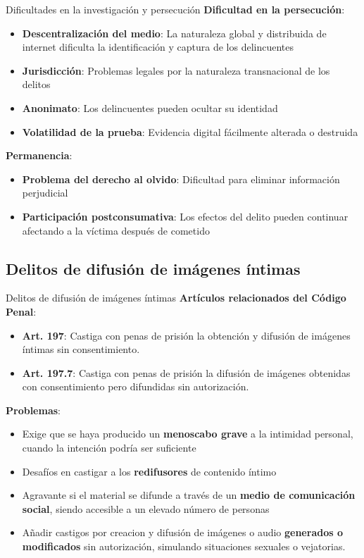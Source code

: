 \documentclass{beamer}
\begin{document}
    \begin{frame}{Dificultades en la investigación y persecución}
        \textbf{Dificultad en la persecución}:
        \begin{itemize}
            \small
            \item \textbf{Descentralización del medio}: La naturaleza global y distribuida de internet dificulta la identificación y captura de los delincuentes
            \item \textbf{Jurisdicción}: Problemas legales por la naturaleza transnacional de los delitos
            \item \textbf{Anonimato}: Los delincuentes pueden ocultar su identidad
            \item \textbf{Volatilidad de la prueba}: Evidencia digital fácilmente alterada o destruida
        \end{itemize}
        \textbf{Permanencia}:
        \begin{itemize}
            \small
            \item \textbf{Problema del derecho al olvido}: Dificultad para eliminar información perjudicial
            \item \textbf{Participación postconsumativa}: Los efectos del delito pueden continuar afectando a la víctima después de cometido
        \end{itemize}
    \end{frame}

    \subsection{Delitos de difusión de imágenes íntimas}
    \begin{frame}{Delitos de difusión de imágenes íntimas}
        \textbf{Artículos relacionados del Código Penal}:
        \begin{itemize}
            \small
            \item \textbf{Art. 197}: Castiga con penas de prisión la obtención y difusión de imágenes íntimas sin consentimiento.
            \item \textbf{Art. 197.7}: Castiga con penas de prisión la difusión de imágenes obtenidas con consentimiento pero difundidas sin autorización.
        \end{itemize}
        \textbf{Problemas}:
        \begin{itemize}
            \small
            \item Exige que se haya producido un \textbf{menoscabo grave} a la intimidad personal, cuando la intención podría ser suficiente
            \item Desafíos en castigar a los \textbf{redifusores} de contenido íntimo
            \item Agravante si el material se difunde a través de un \textbf{medio de comunicación social}, siendo accesible a un elevado número de personas
            \item Añadir castigos por creacion y difusión de imágenes o audio \textbf{generados o modificados} sin autorización, simulando situaciones sexuales o vejatorias.
        \end{itemize}
    \end{frame}
\end{document}
